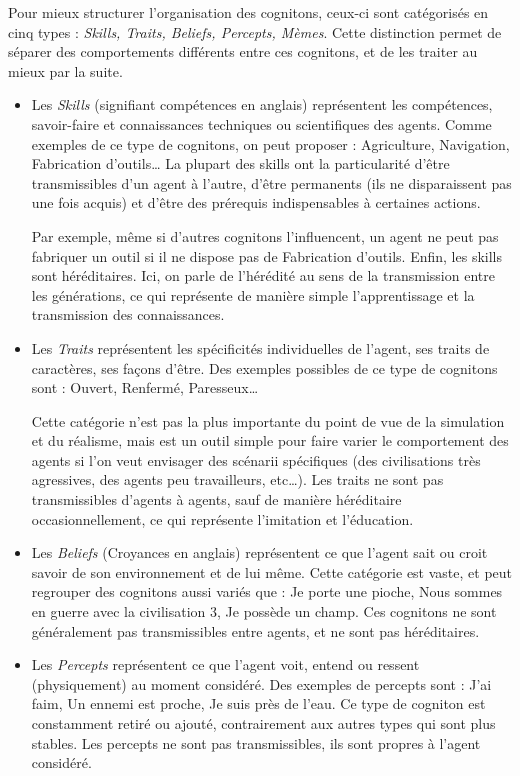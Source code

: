 \documentclass[a4paper,oneside,12 pt]{article}
\begin{document}
	Pour mieux structurer l'organisation des cognitons, ceux-ci sont catégorisés en cinq types :\textit{ Skills, Traits, Beliefs, Percepts, Mèmes}. Cette distinction permet de séparer des comportements différents entre ces cognitons, et de les traiter au mieux par la suite.
\begin{itemize}


\item 	Les\textit{ Skills} (signifiant compétences en anglais) représentent les compétences, savoir-faire et connaissances techniques ou scientifiques des agents. Comme exemples de ce type de cognitons, on peut proposer : Agriculture, Navigation, Fabrication d'outils… La plupart des skills ont la particularité d'être transmissibles d'un agent à l'autre, d'être permanents (ils ne disparaissent pas une fois acquis) et d'être des prérequis indispensables à certaines actions. 
	
	Par exemple, même si d'autres cognitons l'influencent, un agent ne peut pas fabriquer un outil si il ne dispose pas de Fabrication d'outils. Enfin, les skills sont héréditaires. Ici, on parle de l'hérédité au sens de la transmission entre les générations, ce qui représente de manière simple l'apprentissage et la transmission des connaissances.

\item 	Les \textit{Traits} représentent les spécificités individuelles de l'agent, ses traits de caractères, ses façons d'être. Des exemples possibles de ce type de cognitons sont : Ouvert, Renfermé, Paresseux…
	
	Cette catégorie n'est pas la plus importante du point de vue de la simulation et du réalisme, mais est un outil simple pour faire varier le comportement des agents si l'on veut envisager des scénarii spécifiques (des civilisations très agressives, des agents peu travailleurs, etc…). Les traits ne sont pas transmissibles d'agents à agents, sauf de manière héréditaire occasionnellement, ce qui représente l'imitation et l'éducation.

\item 	Les \textit{Beliefs} (Croyances en anglais) représentent ce que l'agent sait ou croit savoir de son environnement et de lui même. Cette catégorie est vaste, et peut regrouper des cognitons aussi variés que : Je porte une pioche, Nous sommes en guerre avec la civilisation 3, Je possède un champ. Ces cognitons ne sont généralement pas transmissibles entre agents, et ne sont pas héréditaires.

\item 	Les \textit{Percepts} représentent ce que l'agent voit, entend ou ressent (physiquement) au moment considéré. Des exemples de percepts sont : J'ai faim, Un ennemi est proche, Je suis près de l'eau. Ce type de cogniton est constamment retiré ou ajouté, contrairement aux autres types qui sont plus stables. Les percepts ne sont pas transmissibles, ils sont propres à l'agent considéré.


\end{itemize}
\end{document}
